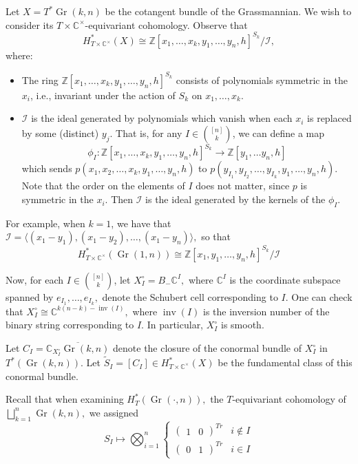 \documentclass[12pt]{amsart}
\numberwithin{equation}{section}
\theoremstyle{definition}
\numberwithin{figure}{section}
\newcommand{\C}{\mathbb{C}}
\newcommand{\Z}{\mathbb{Z}}
\newcommand{\on}[1]{\operatorname{#1}}
\newcommand{\cI}{\mathcal{I}}
\newcommand{\Gr}{\on{Gr}}
\newcommand{\Stil}{\tilde{S}}
\begin{document}
Let $X = T^*\Gr(k, n)$ be the cotangent bundle of the Grassmannian. We wish to consider its $T \times \C^\times$-equivariant cohomology. Observe that
\[H_{T \times \C^\times}^*(X) \cong \Z[x_1, \ldots, x_k, y_1, \ldots, y_n, h]^{S_k}/\cI,\]
where:

\begin{itemize}
	\item The ring $\Z[x_1, \ldots, x_k, y_1, \ldots, y_n, h]^{S_k}$ consists of polynomials symmetric in the $x_i$, i.e., invariant under the action of $S_k$ on $x_1, \ldots, x_k$. \item $\cI$ is the ideal generated by polynomials which vanish when each $x_i$ is replaced by some (distinct) $y_j$. 
	That is, for any $I \in \binom{[n]}{k}$, we can define a map 
	\[\phi_I: \Z[x_1, \ldots, x_k, y_1, \ldots, y_n, h]^{S_k} \rightarrow \Z[y_1, \ldots y_n, h]\] 
	which sends $p(x_1, x_2, \ldots, x_k, y_1, \ldots, y_n, h)$ to $p(y_{I_1}, y_{I_2}, \ldots, y_{I_k}, y_1, \ldots, y_n, h).$ Note that the order on the elements of $I$ does not matter, since $p$ is symmetric in the $x_i.$ Then $\cI$ is the ideal generated by the kernels of the $\phi_I.$
\end{itemize}
For example, when $k=1$, we have that $\cI = \langle (x_1 - y_1), (x_1-y_2), \ldots, (x_1-y_n) \rangle,$ so that
\[H_{T \times \C^\times}^*(\Gr(1,n)) \cong \Z[x_1, y_1, \ldots, y_n, h]^{S_k}/\cI\]

Now, for each $I \in \binom{[n]}{k}$, let $X_I^\circ = B_{-}\C^I,$ where $\C^I$ is the coordinate subspace spanned by $e_{I_1}, \ldots, e_{I_k},$ denote the Schubert cell corresponding to $I$. One can check that $X_I^\circ  \cong \C^{k(n-k)-\on{inv}(I)},$ where $\on{inv}(I)$ is the inversion number of the binary string corresponding to $I$. In particular, $X_I^\circ$ is smooth.

Let $C_I = \overline{\C_{X_I^\circ} \Gr(k, n)}$ denote the closure of the conormal bundle of $X_I^\circ$ in $T^*(\Gr(k,n)).$ Let $\Stil_I = [C_I] \in H_{T \times \C^\times}^*(X)$ be the fundamental class of this conormal bundle.

Recall that when examining $H_T^*(\Gr(\cdot, n)),$ the $T$-equivariant cohomology of $\bigsqcup_{k=1}^n \Gr(k,n),$ we assigned 
\[S_I \mapsto \bigotimes_{i=1}^n \begin{cases}
	\begin{pmatrix}
		1 & 0
	\end{pmatrix}^{Tr} & i \not \in I\\
	\begin{pmatrix}
		0 & 1
	\end{pmatrix}^{Tr} & i \in I
\end{cases}\]
\end{document}
